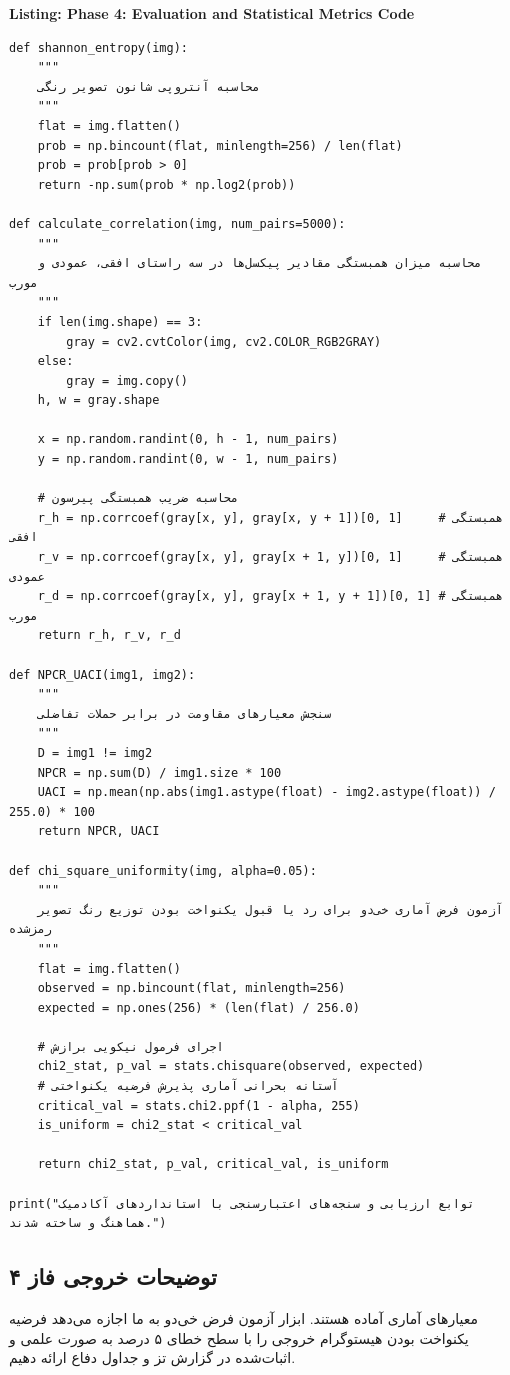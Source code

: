 \begin{latin}
\noindent\textbf{Listing: Phase 4: Evaluation and Statistical Metrics Code}
\begin{verbatim}
def shannon_entropy(img):
    """
    محاسبه آنتروپی شانون تصویر رنگی
    """
    flat = img.flatten()
    prob = np.bincount(flat, minlength=256) / len(flat)
    prob = prob[prob > 0]
    return -np.sum(prob * np.log2(prob))

def calculate_correlation(img, num_pairs=5000):
    """
    محاسبه میزان همبستگی مقادیر پیکسل‌ها در سه راستای افقی، عمودی و مورب
    """
    if len(img.shape) == 3:
        gray = cv2.cvtColor(img, cv2.COLOR_RGB2GRAY)
    else:
        gray = img.copy()
    h, w = gray.shape
    
    x = np.random.randint(0, h - 1, num_pairs)
    y = np.random.randint(0, w - 1, num_pairs)
    
    # محاسبه ضریب همبستگی پیرسون
    r_h = np.corrcoef(gray[x, y], gray[x, y + 1])[0, 1]     # همبستگی افقی
    r_v = np.corrcoef(gray[x, y], gray[x + 1, y])[0, 1]     # همبستگی عمودی
    r_d = np.corrcoef(gray[x, y], gray[x + 1, y + 1])[0, 1] # همبستگی مورب
    return r_h, r_v, r_d

def NPCR_UACI(img1, img2):
    """
    سنجش معیارهای مقاومت در برابر حملات تفاضلی
    """
    D = img1 != img2
    NPCR = np.sum(D) / img1.size * 100
    UACI = np.mean(np.abs(img1.astype(float) - img2.astype(float)) / 255.0) * 100
    return NPCR, UACI

def chi_square_uniformity(img, alpha=0.05):
    """
    آزمون فرض آماری خی‌دو برای رد یا قبول یکنواخت بودن توزیع رنگ تصویر رمزشده
    """
    flat = img.flatten()
    observed = np.bincount(flat, minlength=256)
    expected = np.ones(256) * (len(flat) / 256.0)
    
    # اجرای فرمول نیکویی برازش
    chi2_stat, p_val = stats.chisquare(observed, expected)
    # آستانه بحرانی آماری پذیرش فرضیه یکنواختی
    critical_val = stats.chi2.ppf(1 - alpha, 255)
    is_uniform = chi2_stat < critical_val
    
    return chi2_stat, p_val, critical_val, is_uniform

print("توابع ارزیابی و سنجه‌های اعتبارسنجی با استانداردهای آکادمیک هماهنگ و ساخته شدند.")
\end{verbatim}
\end{latin}

\subsection*{توضیحات خروجی فاز ۴}
معیارهای آماری آماده هستند. ابزار آزمون فرض خی‌دو به ما اجازه می‌دهد فرضیه یکنواخت بودن هیستوگرام خروجی را با سطح خطای ۵ درصد به صورت علمی و اثبات‌شده در گزارش تز و جداول دفاع ارائه دهیم.

